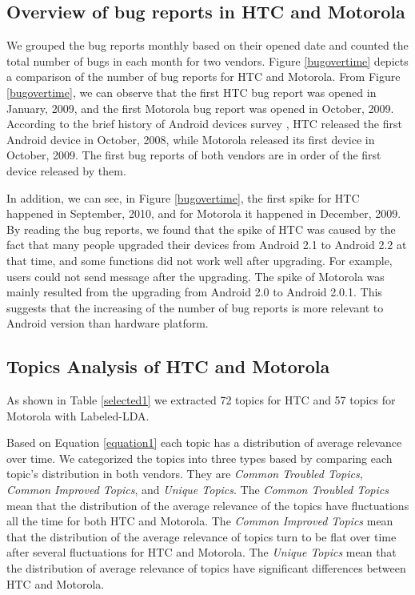 \documentclass[10pt, conference, compsocconf]{IEEEtran}
\begin{document}
\subsection{Overview of bug reports in HTC and Motorola}
We grouped the bug reports monthly based on their opened date and counted the total number of bugs in each month for two vendors. Figure \ref{bugovertime} depicts a comparison of the number of bug reports for HTC and Motorola.
From Figure \ref{bugovertime}, we can observe that the first HTC bug report was opened in January, 2009, and the first Motorola bug report was opened in October, 2009. According to the brief history of Android devices survey \cite{historyofandroid}, HTC released the first Android device in October, 2008, while Motorola released its first device in October, 2009. The first bug reports of both vendors are in order of the first device released by them. 

In addition, we can see, in Figure \ref{bugovertime}, the first spike for HTC happened in September, 2010, and for Motorola it happened in December, 2009. By reading the bug reports, we found that the spike of HTC was caused by the fact that many people upgraded their devices from Android 2.1 to Android 2.2 at that time, and some functions did not work well after upgrading. For example, users could not send message after the upgrading. The spike of Motorola was mainly resulted from the upgrading from Android 2.0 to Android 2.0.1. This suggests that the increasing of the number of bug reports is more relevant to Android version than hardware platform.


\subsection{Topics Analysis of HTC and Motorola}

As shown in Table \ref{selected1} we extracted 72 topics for HTC and 57 topics for Motorola with Labeled-LDA.

Based on Equation \ref{equation1} each topic has a distribution of average relevance over time. We categorized the topics into three types based by comparing each topic's distribution in both vendors. They are \textit{Common Troubled Topics}, \textit{Common Improved Topics}, and \textit{Unique Topics}. 
The \textit{Common Troubled Topics} mean that the distribution of the average relevance of the topics have fluctuations all the time for both HTC and Motorola. The \textit{Common Improved Topics} mean that the distribution of the average relevance of topics turn to be flat over time after several fluctuations for HTC and Motorola. The \textit{Unique Topics} mean that the distribution of average relevance of topics have significant differences between HTC and Motorola.
\end{document}
